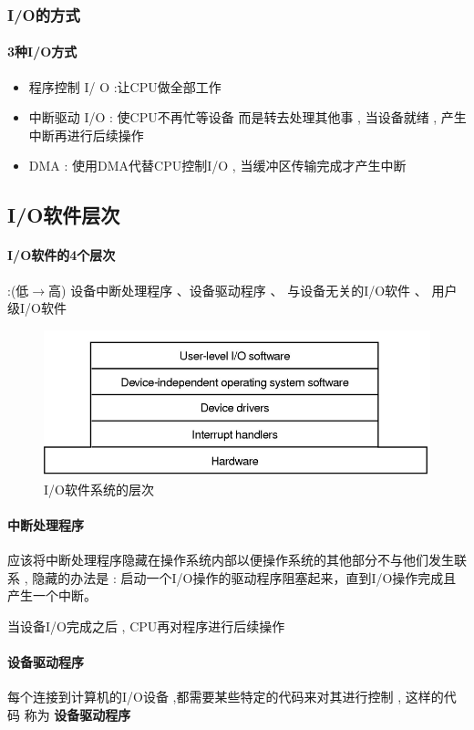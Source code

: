 \documentclass[UTF8,a4paper]{ctexart}
\begin{document}
\subsubsection{I/O的方式}
\paragraph{3种I/O方式}
\begin{itemize}
	\item 程序控制 I/ O :让CPU做全部工作
	\item 中断驱动 I/O  : 使CPU不再忙等设备 而是转去处理其他事 , 当设备就绪 , 产生中断再进行后续操作
	\item DMA : 使用DMA代替CPU控制I/O , 当缓冲区传输完成才产生中断
\end{itemize}

\subsection{I/O软件层次}
\paragraph{I/O软件的4个层次} :(低$\to$高) 设备中断处理程序 、设备驱动程序 、 与设备无关的I/O软件  、 用户级I/O软件

\begin{figure}[H]
	\centering
	\includegraphics[scale = 0.5]{assets/ModernOperatingSystems/2018-01-10-16-32-15.png}
	\caption{I/O软件系统的层次}
\end{figure}

\paragraph{中断处理程序}
应该将中断处理程序隐藏在操作系统内部以便操作系统的其他部分不与他们发生联系 , 隐藏的办法是 :
启动一个I/O操作的驱动程序阻塞起来，直到I/O操作完成且产生一个中断。

当设备I/O完成之后 , CPU再对程序进行后续操作

\paragraph{设备驱动程序}
每个连接到计算机的I/O设备 ,都需要某些特定的代码来对其进行控制 , 这样的代码 称为 \textbf{设备驱动程序}
\end{document}
